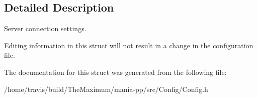 \subsection{Detailed Description}
Server connection settings. 

Editing information in this struct will not result in a change in the configuration file. 

The documentation for this struct was generated from the following file\-:\begin{DoxyCompactItemize}
\item 
/home/travis/build/\-The\-Maximum/mania-\/pp/src/\-Config/Config.\-h\end{DoxyCompactItemize}
